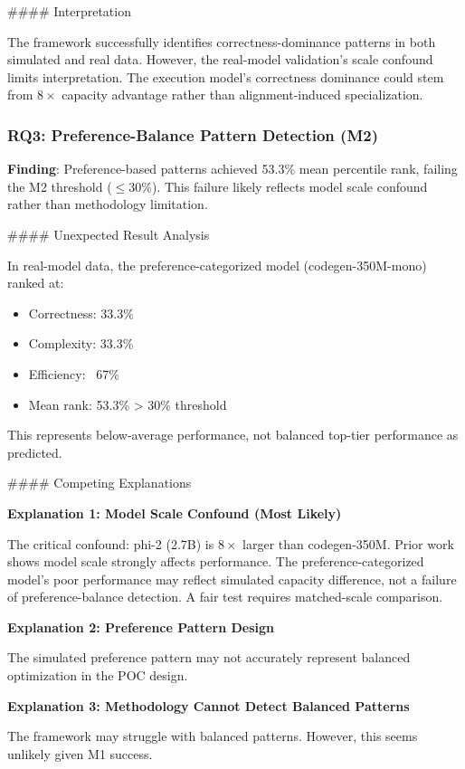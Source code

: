 \#\#\#\# Interpretation

The framework successfully identifies correctness-dominance patterns in both simulated and real data. However, the real-model validation's scale confound limits interpretation. The execution model's correctness dominance could stem from $8\times$ capacity advantage rather than alignment-induced specialization.

\subsubsection{RQ3: Preference-Balance Pattern Detection (M2)}

\textbf{Finding}: Preference-based patterns achieved 53.3\% mean percentile rank, failing the M2 threshold ($\leq 30$\%). This failure likely reflects model scale confound rather than methodology limitation.

\#\#\#\# Unexpected Result Analysis

In real-model data, the preference-categorized model (codegen-350M-mono) ranked at:
\begin{itemize}
\item Correctness: 33.3\%
\item Complexity: 33.3\%
\item Efficiency: ~67\%
\item Mean rank: 53.3\% > 30\% threshold
\end{itemize}

This represents below-average performance, not balanced top-tier performance as predicted.

\#\#\#\# Competing Explanations

\textbf{Explanation 1: Model Scale Confound (Most Likely)}

The critical confound: phi-2 (2.7B) is $8\times$ larger than codegen-350M. Prior work shows model scale strongly affects performance. The preference-categorized model's poor performance may reflect simulated capacity difference, not a failure of preference-balance detection. A fair test requires matched-scale comparison.

\textbf{Explanation 2: Preference Pattern Design}

The simulated preference pattern may not accurately represent balanced optimization in the POC design.

\textbf{Explanation 3: Methodology Cannot Detect Balanced Patterns}

The framework may struggle with balanced patterns. However, this seems unlikely given M1 success.

